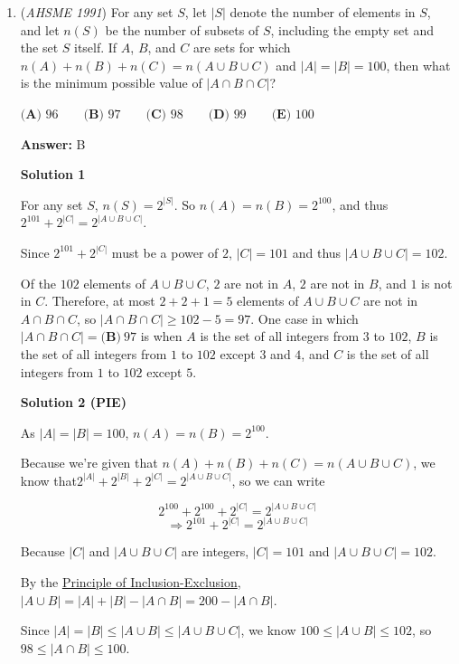 \begin{enumerate}
 


	\item (\textit{AHSME 1991}) For any set $S$, let $|S|$ denote the number of elements in $S$, and let $n(S)$ be the number of subsets of $S$, including the empty set and the set $S$ itself. If $A$, $B$, and $C$ are sets for which $n(A)+n(B)+n(C)=n(A\cup B\cup C)$ and $|A|=|B|=100$, then what is the minimum possible value of $|A\cap B\cap C|$?


 $\textbf{(A) } 96 \qquad \textbf{(B) } 97 \qquad \textbf{(C) } 98 \qquad \textbf{(D) } 99 \qquad \textbf{(E) } 100$

 \textbf{Answer: }B



\textbf{Solution 1}

For any set $S$, $n(S) = 2^{|S|}$.  So $n(A)=n(B)=2^{100}$, and thus $2^{101} + 2^{|C|} = 2^{|A \cup B \cup C|}$. 

 Since $2^{101} + 2^{|C|}$ must be a power of $2$, $|C| = 101$ and thus $|A \cup B \cup C| = 102$.

 Of the $102$ elements of $A \cup B \cup C$, $2$ are not in $A$, $2$ are not in $B$, and $1$ is not in $C$.  Therefore, at most $2 + 2 + 1 = 5$ elements of $A \cup B \cup C$ are not in $A \cap B \cap C$, so $|A \cap B \cap C| \geq 102 - 5 = 97$.  One case in which $|A \cap B \cap C| = \boxed{\textbf{(B)}\ 97}$ is when $A$ is the set of all integers from $3$ to $102$, $B$ is the set of all integers from $1$ to $102$ except $3$ and $4$, and $C$ is the set of all integers from $1$ to $102$ except $5$.

 



\textbf{Solution 2 (PIE)}

As $|A|=|B|=100$, $n(A)=n(B)=2^{100}.$

 Because we're given that $n(A)+n(B)+n(C)=n(A \cup B \cup C)$, we know that$2^{|A|}+2^{|B|}+2^{|C|}=2^{|A \cup B \cup C|}$, so we can write 

 
 \[2^{100}+2^{100}+2^{|C|}=2^{|A \cup B \cup C|}\]
 \[\Rightarrow 2^{101}+2^{|C|}=2^{|A \cup B \cup C|}\]

 Because $|C|$ and $|A \cup B \cup C|$ are integers, $|C|=101$ and $|A \cup B \cup C| = 102.$

 
By the \href{https://artofproblemsolving.com/wiki/index.php?title=Principle\_of\_Inclusion-Exclusion}{Principle of Inclusion-Exclusion}, $|A \cup B| = |A| + |B| - |A \cap B| = 200 - |A \cap B|.$

 Since $|A|=|B| \le |A \cup B| \le |A \cup B \cup C|$, we know $100 \le |A \cup B| \le 102$, so $98 \le |A \cap B| \le 100.$


\end{enumerate}
